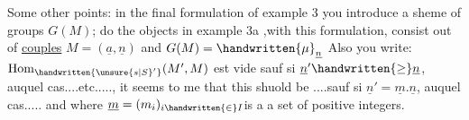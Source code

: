 Some other points: in the final formulation of example 3 you introduce a sheme of groups $G(M)$;  do the objects in example 3a ,with this formulation, consist out of \uline{couples} $M=(\underline{a},\underline{n})$ and $G(M)=\handwritten{\mu}_{\underline{n}}$  Also you write: $\mathrm{Hom}_{\handwritten{\unsure{s|S}'}}(M',M)$ est vide sauf si $\underline{n}'\handwritten{\geq}\underline{n}$, auquel cas....etc....., it seems to me that this shuold be ....sauf si $\underline{n}'=\underline{m}.\underline{n}$, auquel cas..... and where $\underline{m}=(m_i)_{i\handwritten{\in}I}$is a a set of positive integers.

